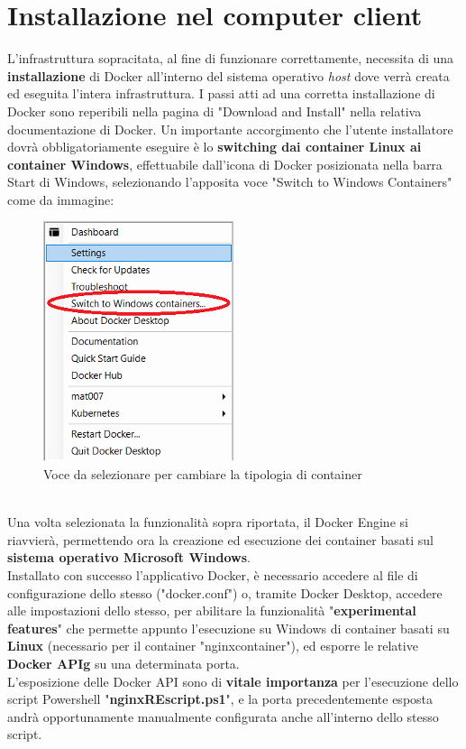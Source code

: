 \section{Installazione nel computer client}
L'infrastruttura sopracitata, al fine di funzionare correttamente, necessita di una \textbf{installazione} di Docker all'interno del sistema operativo \textit{host} dove verrà creata ed eseguita l'intera infrastruttura.
I passi atti ad una corretta installazione di Docker sono reperibili nella pagina di "Download and Install" nella relativa documentazione di Docker. Un importante accorgimento che l'utente installatore dovrà obbligatoriamente eseguire è lo \textbf{switching dai container Linux ai container Windows}, effettuabile dall'icona di Docker posizionata nella barra Start di Windows, selezionando l'apposita voce "Switch to Windows Containers" come da immagine:
\begin{figure}[!h]     
\centering 
    \includegraphics[width=0.2\columnwidth]{immagini/img/switch_windows_container} 
    \caption{Voce da selezionare per cambiare la tipologia di container}
\end{figure}\\
Una volta selezionata la funzionalità sopra riportata, il Docker Engine si riavvierà, permettendo ora la creazione ed esecuzione dei container basati sul \textbf{sistema operativo Microsoft Windows}.\\
Installato con successo l'applicativo Docker, è necessario accedere al file di configurazione dello stesso ("docker.conf") o, tramite Docker Desktop, accedere alle impostazioni dello stesso, per abilitare la funzionalità "\textbf{experimental features}" che permette appunto l'esecuzione su Windows di container basati su \textbf{Linux} (necessario per il container "nginxcontainer"), ed esporre le relative \textbf{\gls{Docker APIg}} su una determinata porta.\\
L'esposizione delle Docker API sono di \textbf{vitale importanza} per l'esecuzione dello script Powershell "\textbf{nginxREscript.ps1}", e la porta precedentemente esposta andrà opportunamente manualmente configurata anche all'interno dello stesso script.\\
